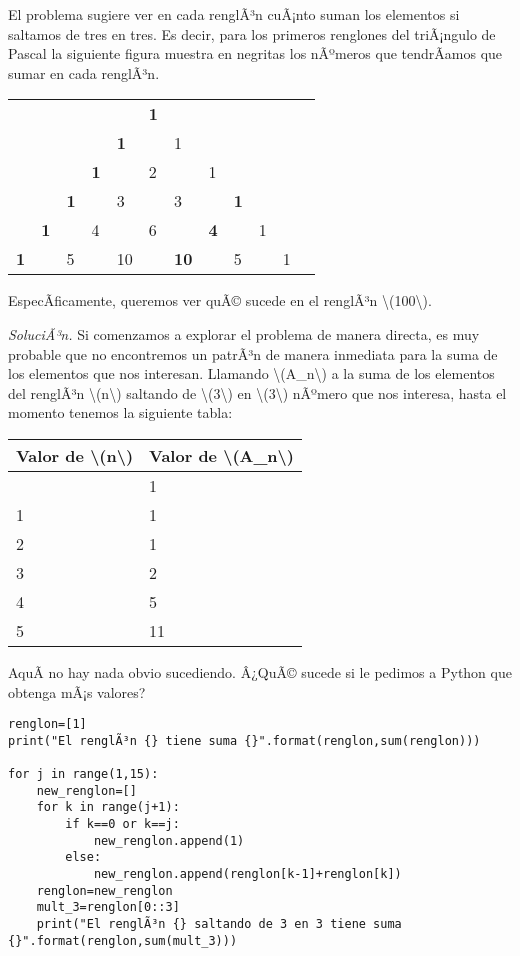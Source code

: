 \documentclass[
]{article}
\begin{document}
El problema sugiere ver en cada renglÃ³n cuÃ¡nto suman los elementos si
saltamos de tres en tres. Es decir, para los primeros renglones del
triÃ¡ngulo de Pascal la siguiente figura muestra en negritas los
nÃºmeros que tendrÃ­amos que sumar en cada renglÃ³n.

\begin{longtable}[]{@{}llllllllllll@{}}
\toprule\noalign{}
& & & & & & & & & & & \\
\midrule\noalign{}
\endhead
\bottomrule\noalign{}
\endlastfoot
& & & & & \textbf{1} & & & & & & \\
& & & & \textbf{1} & & 1 & & & & & \\
& & & \textbf{1} & & 2 & & 1 & & & & \\
& & \textbf{1} & & 3 & & 3 & & \textbf{1} & & & \\
& \textbf{1} & & 4 & & 6 & & \textbf{4} & & 1 & & \\
\textbf{1} & & 5 & & 10 & & \textbf{10} & & 5 & & 1 & \\
\end{longtable}

EspecÃ­ficamente, queremos ver quÃ© sucede en el renglÃ³n
{\textbackslash(100\textbackslash)}.

\emph{SoluciÃ³n.} Si comenzamos a explorar el problema de manera
directa, es muy probable que no encontremos un patrÃ³n de manera
inmediata para la suma de los elementos que nos interesan. Llamando
{\textbackslash(A\_n\textbackslash)} a la suma de los elementos del
renglÃ³n {\textbackslash(n\textbackslash)} saltando de
{\textbackslash(3\textbackslash)} en {\textbackslash(3\textbackslash)}
nÃºmero que nos interesa, hasta el momento tenemos la siguiente tabla:

\begin{longtable}[]{@{}ll@{}}
\toprule\noalign{}
Valor de {\textbackslash(n\textbackslash)} & Valor de
{\textbackslash(A\_n\textbackslash)} \\
\midrule\noalign{}
\endhead
\bottomrule\noalign{}
\endlastfoot
0 & 1 \\
1 & 1 \\
2 & 1 \\
3 & 2 \\
4 & 5 \\
5 & 11 \\
\end{longtable}

AquÃ­ no hay nada obvio sucediendo. Â¿QuÃ© sucede si le pedimos a Python
que obtenga mÃ¡s valores?

\begin{verbatim}
renglon=[1]
print("El renglÃ³n {} tiene suma {}".format(renglon,sum(renglon)))

for j in range(1,15):
    new_renglon=[]
    for k in range(j+1):
        if k==0 or k==j:
            new_renglon.append(1)
        else:
            new_renglon.append(renglon[k-1]+renglon[k])
    renglon=new_renglon
    mult_3=renglon[0::3]
    print("El renglÃ³n {} saltando de 3 en 3 tiene suma {}".format(renglon,sum(mult_3)))
\end{verbatim}
\end{document}
